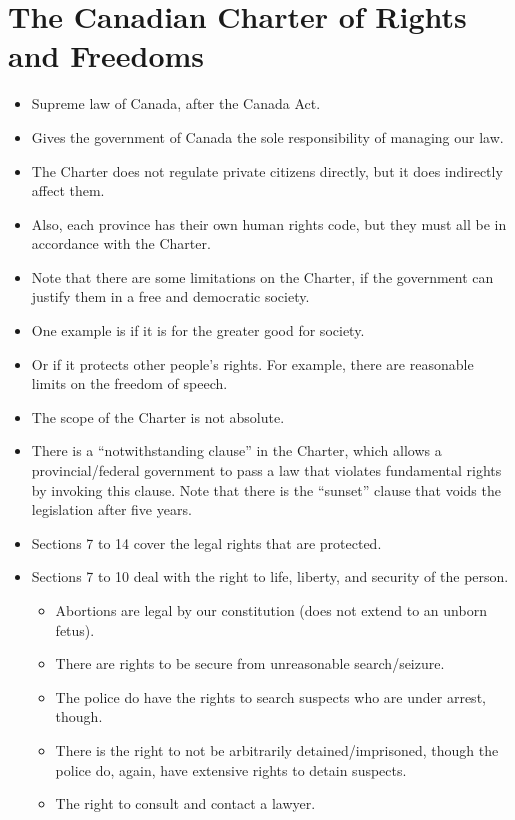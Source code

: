 \documentclass{article}
\begin{document}
\section{The Canadian Charter of Rights and Freedoms}
\begin{itemize}
    \item Supreme law of Canada, after the Canada Act.
    \item Gives the government of Canada the sole responsibility of managing our law.
    \item The Charter does not regulate private citizens directly, but it does indirectly affect them.
    \item Also, each province has their own human rights code, but they must all be in accordance with the Charter.
    \item Note that there are some limitations on the Charter, if the government can justify them in a free and democratic society.
    \item One example is if it is for the greater good for society.
    \item Or if it protects other people's rights.  For example, there are reasonable limits on the freedom of speech.
    \item The scope of the Charter is not absolute.
    \item There is a ``notwithstanding clause'' in the Charter, which allows a provincial/federal government to pass a law that violates fundamental rights by invoking this clause.  Note that there is the ``sunset'' clause that voids the legislation after five years.
    \item Sections 7 to 14 cover the legal rights that are protected.
    \item Sections 7 to 10 deal with the right to life, liberty, and security of the person.
        \begin{itemize}
            \item Abortions are legal by our constitution (does not extend to an unborn fetus).
            \item There are rights to be secure from unreasonable search/seizure.
            \item The police do have the rights to search suspects who are under arrest, though.
            \item There is the right to not be arbitrarily detained/imprisoned, though the police do, again, have extensive rights to detain suspects.
            \item The right to consult and contact a lawyer.

\end{itemize}
\end{itemize}
\end{document}
